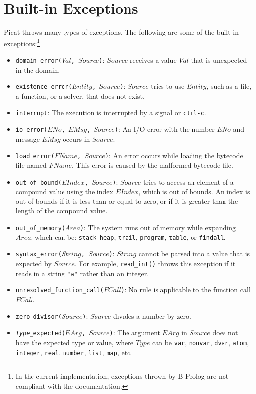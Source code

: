 \section{Built-in Exceptions}
Picat throws many types of exceptions. The following are some of the built-in exceptions:\footnote{In the current implementation, exceptions thrown by B-Prolog are not compliant with the documentation.}
\begin{itemize}
\item \texttt{domain\_error($Val$, $Source$)}: $Source$ receives a value $Val$ that is unexpected in the domain.
\item \texttt{existence\_error($Entity$, $Source$)}: $Source$ tries to use $Entity$, such as a file, a function, or a solver, that does not exist.
\item \texttt{interrupt}: The execution is interrupted by a signal or \texttt{ctrl-c}.
\item \texttt{io\_error($ENo$, $EMsg$, $Source$)}: An I/O error with the number $ENo$ and message $EMsg$ occurs in $Source$.
\item \texttt{load\_error($FName$, $Source$)}: An error occurs while loading the bytecode file named $FName$.  This error is caused by the malformed bytecode file.
\item \texttt{out\_of\_bound($EIndex$, $Source$)}: $Source$ tries to access an element of a compound value using the index $EIndex$, which is out of bounds.  An index is out of bounds if it is less than or equal to zero, or if it is greater than the length of the compound value.
\item \texttt{out\_of\_memory($Area$)}: The system runs out of memory while expanding $Area$, which can be: \texttt{stack\_heap}, \texttt{trail}, \texttt{program}, \texttt{table}, or \texttt{findall}.
\item \texttt{syntax\_error($String$, $Source$)}: $String$ cannot be parsed into a value that is expected by $Source$. For example, \texttt{read\_int()} throws this exception if it reads in a string \texttt{"a"} rather than an integer.
\item \texttt{unresolved\_function\_call($FCall$)}: No rule is applicable to the function call $FCall$.
\item \texttt{zero\_divisor($Source$)}: $Source$ divides a number by zero.
\item \texttt{\emph{Type}\_expected($EArg$, $Source$)}: The argument $EArg$ in $Source$ does not have the expected type or value, where $Type$ can be \texttt{var}, \texttt{nonvar}, \texttt{dvar}, \texttt{atom}, \texttt{integer}, \texttt{real}, \texttt{number}, \texttt{list}, \texttt{map}, etc.
\end{itemize}

